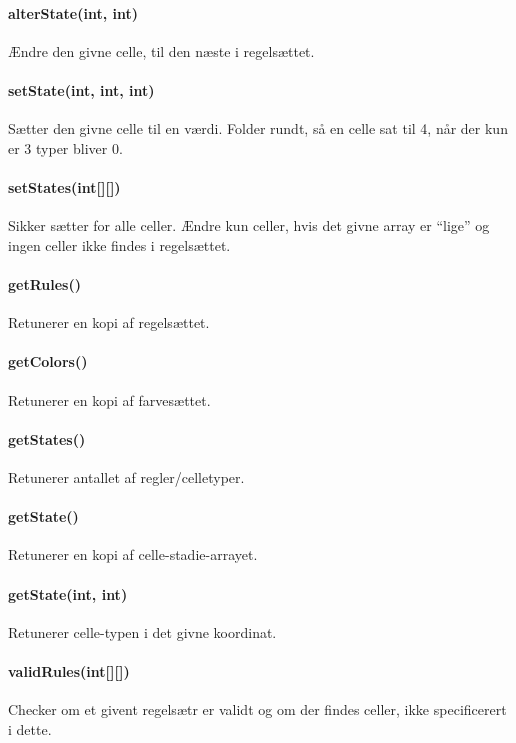 \paragraph{alterState(int, int)} Ændre den givne celle, til den næste i regelsættet.

\paragraph{setState(int, int, int)} Sætter den givne celle til en værdi. Folder rundt, så en celle sat til 4, når der kun er 3 typer bliver 0.

\paragraph{setStates(int[][])} Sikker sætter for alle celler. Ændre kun celler, hvis det givne array er ``lige'' og ingen celler ikke findes i regelsættet.

\paragraph{getRules()} Retunerer en kopi af regelsættet.

\paragraph{getColors()} Retunerer en kopi af farvesættet.

\paragraph{getStates()} Retunerer antallet af regler/celletyper.

\paragraph{getState()} Retunerer en kopi af celle-stadie-arrayet.

\paragraph{getState(int, int)} Retunerer celle-typen i det givne koordinat.

\paragraph{validRules(int[][])} Checker om et givent regelsætr er validt og om der findes celler, ikke specificerert i dette.

